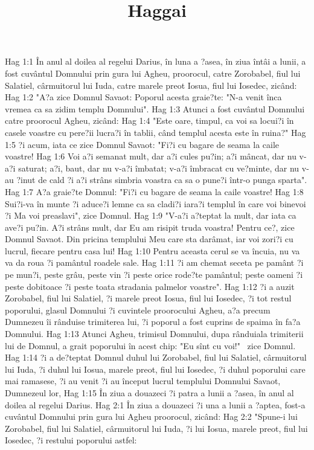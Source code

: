 

\title{Haggai}

Hag 1:1  În anul al doilea al regelui Darius, în luna a ?asea, în ziua întâi a lunii, a fost cuvântul Domnului prin gura lui Agheu, proorocul, catre Zorobabel, fiul lui Salatiel, cârmuitorul lui Iuda, catre marele preot Iosua, fiul lui Iosedec, zicând:
Hag 1:2  "A?a zice Domnul Savaot: Poporul acesta graie?te: "N-a venit înca vremea ca sa zidim templu Domnului".
Hag 1:3  Atunci a fost cuvântul Domnului catre proorocul Agheu, zicând:
Hag 1:4  "Este oare, timpul, ca voi sa locui?i în casele voastre cu pere?ii lucra?i în tablii, când templul acesta este în ruina?"
Hag 1:5  ?i acum, iata ce zice Domnul Savaot: "Fi?i cu bagare de seama la caile voastre!
Hag 1:6  Voi a?i semanat mult, dar a?i cules pu?in; a?i mâncat, dar nu v-a?i saturat; a?i, baut, dar nu v-a?i îmbatat; v-a?i îmbracat cu ve?minte, dar nu v-au ?inut de cald ?i a?i strâns simbria voastra ca sa o pune?i într-o punga sparta".
Hag 1:7  A?a graie?te Domnul: "Fi?i cu bagare de seama la caile voastre!
Hag 1:8  Sui?i-va în munte ?i aduce?i lemne ca sa cladi?i iara?i templul în care voi binevoi ?i Ma voi preaslavi", zice Domnul.
Hag 1:9  "V-a?i a?teptat la mult, dar iata ca ave?i pu?in. A?i strâns mult, dar Eu am risipit truda voastra! Pentru ce?, zice Domnul Savaot. Din pricina templului Meu care sta darâmat, iar voi zori?i cu lucrul, fiecare pentru casa lui!
Hag 1:10  Pentru aceasta cerul se va încuia, nu va va da roua ?i pamântul roadele sale.
Hag 1:11  ?i am chemat seceta pe pamânt ?i pe mun?i, peste grâu, peste vin ?i peste orice rode?te pamântul; peste oameni ?i peste dobitoace ?i peste toata stradania palmelor voastre".
Hag 1:12  ?i a auzit Zorobabel, fiul lui Salatiel, ?i marele preot Iosua, fiul lui Iosedec, ?i tot restul poporului, glasul Domnului ?i cuvintele proorocului Agheu, a?a precum Dumnezeu îi rânduise trimiterea lui, ?i poporul a fost cuprins de spaima în fa?a Domnului.
Hag 1:13  Atunci Agheu, trimisul Domnului, dupa rânduiala trimiterii lui de Domnul, a grait poporului în acest chip: "Eu sînt cu voi!"  zice Domnul.
Hag 1:14  ?i a de?teptat Domnul duhul lui Zorobabel, fiul lui Salatiel, cârmuitorul lui Iuda, ?i duhul lui Iosua, marele preot, fiul lui Iosedec, ?i duhul poporului care mai ramasese, ?i au venit ?i au început lucrul templului Domnului Savaot, Dumnezeul lor,
Hag 1:15  În ziua a douazeci ?i patra a lunii a ?asea, în anul al doilea al regelui Darius.
Hag 2:1  În ziua a douazeci ?i una a lunii a ?aptea, fost-a cuvântul Domnului prin gura lui Agheu proorocul, zicând:
Hag 2:2  "Spune-i lui Zorobabel, fiul lui Salatiel, cârmuitorul lui Iuda, ?i lui Iosua, marele preot, fiul lui Iosedec, ?i restului poporului astfel:
